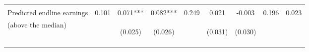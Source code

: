 \begin{tabular}{lcccccccc}
\hline
\\
Predicted endline earnings & 0.101& 0.071*** & 0.082*** & 0.249 & 0.021 & -0.003 & 0.196 & 0.023\\
(above the median) & & \begin{footnotesize}(0.025)\end{footnotesize} & \begin{footnotesize}(0.026)\end{footnotesize} &&
\begin{footnotesize}(0.031)\end{footnotesize} & \begin{footnotesize}(0.030)\end{footnotesize}\\
\noalign{\smallskip}\hline
\end{tabular}
